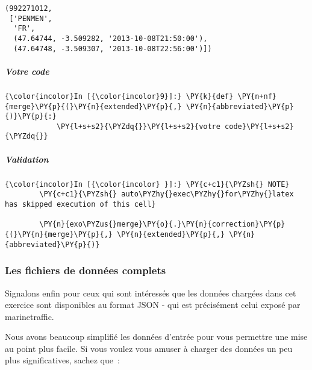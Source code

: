     \begin{Verbatim}[commandchars=\\\{\}]
(992271012,
 ['PENMEN',
  'FR',
  (47.64744, -3.509282, '2013-10-08T21:50:00'),
  (47.64748, -3.509307, '2013-10-08T22:56:00')])

    \end{Verbatim}

    \hypertarget{votre-code}{%
\subparagraph{Votre code}\label{votre-code}}

    \begin{Verbatim}[commandchars=\\\{\}]
{\color{incolor}In [{\color{incolor}9}]:} \PY{k}{def} \PY{n+nf}{merge}\PY{p}{(}\PY{n}{extended}\PY{p}{,} \PY{n}{abbreviated}\PY{p}{)}\PY{p}{:}
            \PY{l+s+s2}{\PYZdq{}}\PY{l+s+s2}{votre code}\PY{l+s+s2}{\PYZdq{}}
\end{Verbatim}


    \hypertarget{validation}{%
\subparagraph{Validation}\label{validation}}

    \begin{Verbatim}[commandchars=\\\{\}]
{\color{incolor}In [{\color{incolor} }]:} \PY{c+c1}{\PYZsh{} NOTE}
        \PY{c+c1}{\PYZsh{} auto\PYZhy{}exec\PYZhy{}for\PYZhy{}latex has skipped execution of this cell}
        
        \PY{n}{exo\PYZus{}merge}\PY{o}{.}\PY{n}{correction}\PY{p}{(}\PY{n}{merge}\PY{p}{,} \PY{n}{extended}\PY{p}{,} \PY{n}{abbreviated}\PY{p}{)}
\end{Verbatim}


    \hypertarget{les-fichiers-de-donnuxe9es-complets}{%
\subsubsection{Les fichiers de données
complets}\label{les-fichiers-de-donnuxe9es-complets}}

    Signalons enfin pour ceux qui sont intéressés que les données chargées
dans cet exercice sont disponibles au format JSON - qui est précisément
celui exposé par marinetraffic.

Nous avons beaucoup simplifié les données d'entrée pour vous permettre
une mise au point plus facile. Si vous voulez vous amuser à charger des
données un peu plus significatives, sachez que~:

